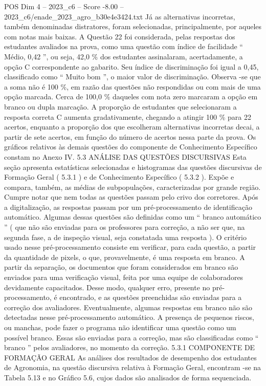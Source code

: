 \begin{textsample}{POS Dim 4 – 2023\_c6 – Score -8.00 – 2023\_c6/enade\_2023\_agro\_b30e4e3424.txt}
Já as alternativas incorretas, também denominadas distratores, foram selecionadas, principalmente, por aqueles com notas mais baixas.
A Questão 22 foi considerada, pelas respostas dos estudantes avaliados na prova, como uma questão com índice de facilidade “ Médio, 0,42 ”, ou seja, 42,0 \% dos estudantes assinalaram, acertadamente, a opção C correspondente ao gabarito.
Seu índice de discriminação foi igual a 0,45, classificado como “ Muito bom ”, o maior valor de discriminação.
Observa -se que a soma não é 100 \%, em razão das questões não respondidas ou com mais de uma opção marcada.
Cerca de 100,0 \% daqueles com nota zero marcaram a opção em branco ou dupla marcação.
A proporção de estudantes que selecionaram a resposta correta C aumenta gradativamente, chegando a atingir 100 \% para 22 acertos, enquanto a proporção dos que escolheram alternativas incorretas decai, a partir de sete acertos, em função do número de acertos nessa parte da prova.
Os gráficos relativos às demais questões do componente de Conhecimento Específico constam no Anexo IV. 5.3 ANÁLISE DAS QUESTÕES DISCURSIVAS Esta seção apresenta estatísticas selecionadas e histogramas das questões discursivas de Formação Geral ( 5.3.1 ) e de Conhecimento Específico ( 5.3.2 ).
Expõe e compara, também, as médias de subpopulações, caracterizadas por grande região.
Cumpre notar que nem todas as questões passam pelo crivo dos corretores.
Após a digitalização, as respostas passam por um pré-processamento de identificação automático.
Algumas dessas questões são definidas como um “ branco automático ” ( que não são enviadas para os professores para correção, a não ser que, na segunda fase, a de inspeção visual, seja constatada uma resposta ).
O critério usado nesse pré-processamento consiste em verificar, para cada questão, a partir da quantidade de pixels, o que, provavelmente, é uma resposta em branco.
A partir da separação, os documentos que foram considerados em branco são enviados para uma verificação visual, feita por uma equipe de colaboradores devidamente capacitados.
Desse modo, qualquer erro, presente no pré-processamento, é encontrado, e as questões preenchidas são enviadas para a correção dos avaliadores.
Eventualmente, algumas respostas em branco não são detectadas nesse pré-processamento automático.
A presença de pequenos riscos, ou manchas, pode fazer o programa não identificar uma questão como um possível branco.
Essas são enviadas para a correção, mas são classificadas como “ branco ” pelos avaliadores, no momento da correção. 5.3.1 COMPONENTE DE FORMAÇÃO GERAL As análises dos resultados de desempenho dos estudantes de Agronomia, na questão discursiva relativa à Formação Geral, encontram -se na Tabela 5.13 e no Gráfico 5.6, cujos dados são analisados de forma sequenciada.

\end{textsample}
